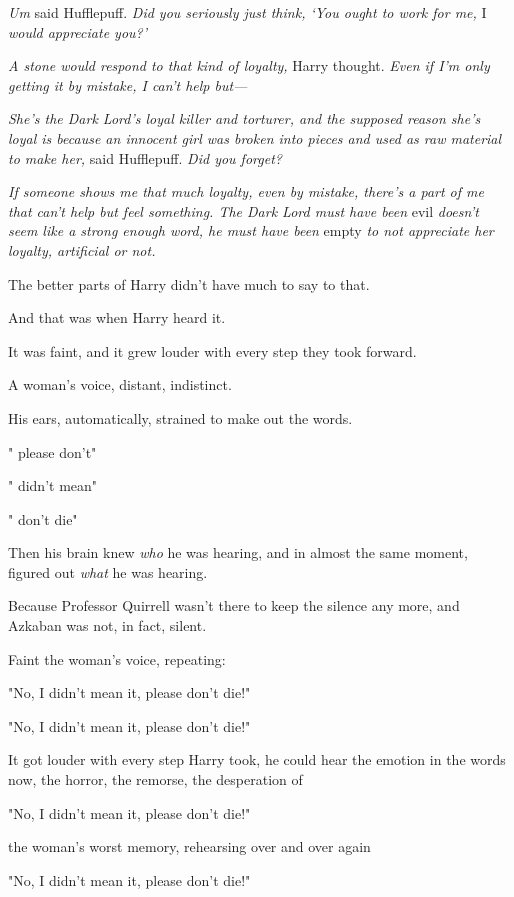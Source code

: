 \emph{Um{\el}} said Hufflepuff. \emph{Did you seriously just think, `You
ought to work for me,} I \emph{would appreciate you?'}

\emph{A stone would respond to that kind of loyalty,} Harry thought. \emph{Even
if I'm only getting it by mistake, I can't help but---}

\emph{She's the Dark Lord's loyal killer and torturer, and the supposed reason
she's loyal is because an innocent girl was broken into pieces and used as raw
material to make her,} said Hufflepuff. \emph{Did you forget?}

\emph{If someone shows me that much loyalty, even by mistake, there's a part of
me that can't help but feel something. The Dark Lord must have been{\el}}
evil \emph{doesn't seem like a strong enough word, he must have been}
empty\emph{{\el} to not appreciate her loyalty, artificial or not.}

The better parts of Harry didn't have much to say to that.

And that was when Harry heard it.

It was faint, and it grew louder with every step they took forward.

A woman's voice, distant, indistinct.

His ears, automatically, strained to make out the words.

"{\el} please don't{\el}"

"{\el} didn't mean{\el}"

"{\el} don't die{\el}"

Then his brain knew \emph{who} he was hearing, and in almost the same moment,
figured out \emph{what} he was hearing.

Because Professor Quirrell wasn't there to keep the silence any more, and
Azkaban was not, in fact, silent.

Faint the woman's voice, repeating:

"No, I didn't mean it, please don't die!"

"No, I didn't mean it, please don't die!"

It got louder with every step Harry took, he could hear the emotion in the
words now, the horror, the remorse, the desperation of{\el}

"No, I didn't mean it, please don't die!"

{\el} the woman's worst memory, rehearsing over and over again{\el}

"No, I didn't mean it, please don't die!"

